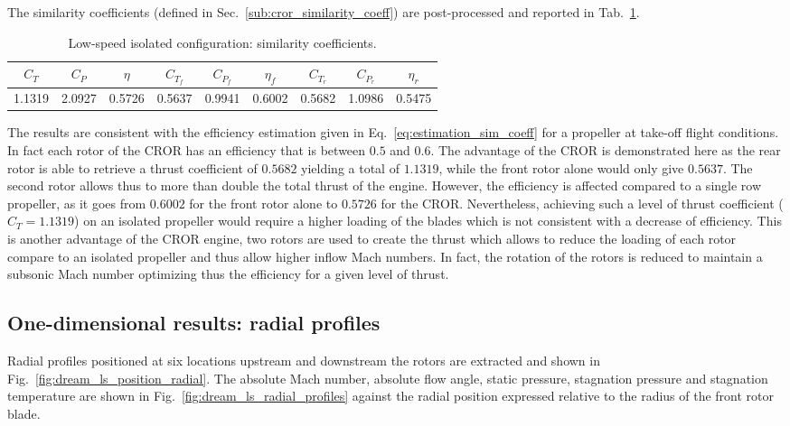 The similarity coefficients (defined in 
Sec.~\ref{sub:cror_similarity_coeff}) are post-processed 
and reported in Tab.~\ref{tab:dream_ls_sim_coeff}.
\begin{table}[htp]
   \centering
  \begin{tabular}{ccc|cccccc}
    \toprule
    $C_T$ & $C_P$ & $\eta$ & $C_{T_f}$ & $C_{P_f}$ & $\eta_f$ & $C_{T_r}$ & $C_{P_r}$ & $\eta_r$ \\
    \midrule
    1.1319 & 2.0927 & 0.5726 & 0.5637 & 0.9941 &  0.6002 & 0.5682 & 1.0986 &  0.5475 \\
    \bottomrule
  \end{tabular}
  \caption{Low-speed isolated configuration: similarity coefficients.}
  \label{tab:dream_ls_sim_coeff}
\end{table}
The results are consistent with the efficiency estimation given in 
Eq.~\eqref{eq:estimation_sim_coeff} for a propeller at take-off flight conditions.
In fact each rotor of the CROR has an efficiency that is between $0.5$
and $0.6$. The advantage of the CROR is demonstrated here as the rear
rotor is able to retrieve a thrust coefficient of $0.5682$ yielding
a total of $1.1319$, while
the front rotor alone would only give $0.5637$.
The second rotor allows thus to more than double the total thrust of the engine.
However, the efficiency is affected compared to a single row 
propeller, as
it goes from $0.6002$ for the front rotor alone to $0.5726$ for the CROR.
Nevertheless, achieving such a level of thrust coefficient ($C_T = 1.1319$)
on an isolated
propeller would require a higher loading of the blades which is not
consistent with a decrease of efficiency.
This is another advantage 
of the CROR engine, two rotors are used to create the thrust which allows to
reduce the loading of each rotor compare to an isolated propeller and thus
allow higher inflow Mach numbers. In fact, the rotation of the rotors is reduced 
to maintain a subsonic Mach number optimizing thus the efficiency
for a given level of thrust.


\subsection{One-dimensional results: radial profiles}
\label{sub:dream_ls_radial_profiles}

Radial profiles positioned at six locations upstream and downstream the rotors
are extracted and shown in Fig.~\ref{fig:dream_ls_position_radial}.
The absolute
Mach number, absolute flow angle, static pressure, 
stagnation pressure and stagnation temperature
are shown in Fig.~\ref{fig:dream_ls_radial_profiles}
against the radial position expressed
relative to the radius of the front rotor blade.

